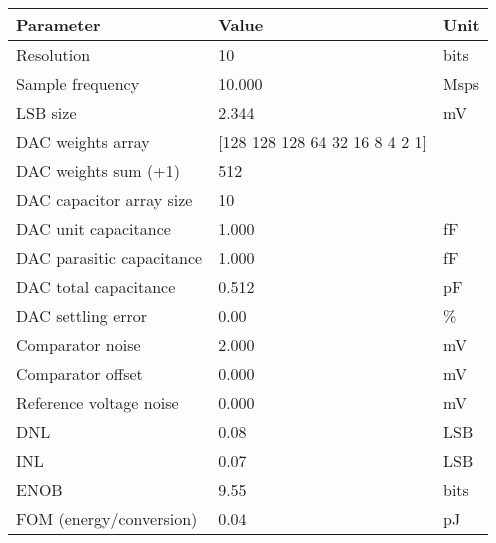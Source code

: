 \begin{tabular}{lll}
\toprule
Parameter & Value & Unit \\
\midrule
Resolution & 10 & bits \\
Sample frequency & 10.000 & Msps \\
LSB size & 2.344 & mV \\
DAC weights array & [128 128 128  64  32  16   8   4   2   1] &  \\
DAC weights sum (+1) & 512 &  \\
DAC capacitor array size & 10 &  \\
DAC unit capacitance & 1.000 & fF \\
DAC parasitic capacitance & 1.000 & fF \\
DAC total capacitance & 0.512 & pF \\
DAC settling error & 0.00 & \% \\
Comparator noise & 2.000 & mV \\
Comparator offset & 0.000 & mV \\
Reference voltage noise & 0.000 & mV \\
DNL & 0.08 & LSB \\
INL & 0.07 & LSB \\
ENOB & 9.55 & bits \\
FOM (energy/conversion) & 0.04 & pJ \\
\bottomrule
\end{tabular}
